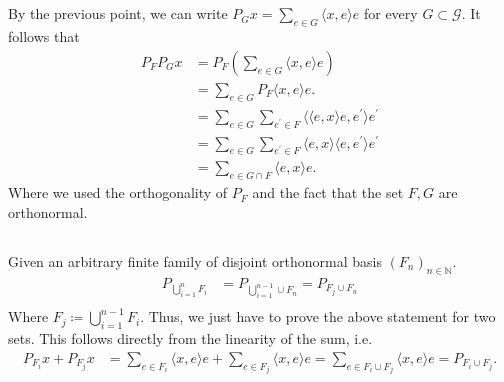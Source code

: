 \documentclass[a4paper,12pt]{article} %
\begin{document}
\subsection{}
By the previous point, we can write \(P_G x = \sum_{e \in  G}\langle x,e \rangle e \) for every \(G \subset \mathcal{G}\).
It follows that
\begin{align*}
    P_F P_G x & = P_F \left( \sum_{e \in  G}\langle x,e \rangle e  \right)
    \\
              & = \sum_{e \in  G} P_F \langle x,e \rangle e.                                                                \\
              & = \sum_{e \in  G} \sum_{e^{\prime}  \in F} \langle \langle e, x \rangle e, e^{\prime}  \rangle e^{\prime}   \\
              & = \sum_{e \in  G} \sum_{e^{\prime}  \in F}   \langle e, x \rangle \langle e, e^{\prime}  \rangle e^{\prime} \\
              & = \sum_{e \in  G \cap F}\langle e, x \rangle  e .
\end{align*}
Where we used the orthogonality of \(P_F\) and the fact that the set \(F,G\) are orthonormal.



\subsection{}
Given an arbitrary finite family of disjoint orthonormal basis \((F_n)_{n \in \mathbb{N}}\).
\begin{align*}
    P_{\bigcup_{i=1}^{n} F_i } & = P_{\bigcup_{i=1}^{n-1}  \cup F_n} = P_{F_j \cup F_n} \\
\end{align*}
Where \(F_j \coloneqq  \bigcup_{i=1}^{n-1}F_i \). Thus, we just have to prove the above statement for two sets. This follows directly from the linearity of the sum, i.e.
\begin{align*}
    P_{F_i}x + P_{F_j}x & = \sum_{e \in F_i} \langle x,e \rangle e + \sum_{e \in  F_j} \langle x, e \rangle e = \sum_{e \in  F_i \cup F_j}\langle x,e \rangle e= P_{F_i \cup F_j}.
\end{align*}
\end{document}
